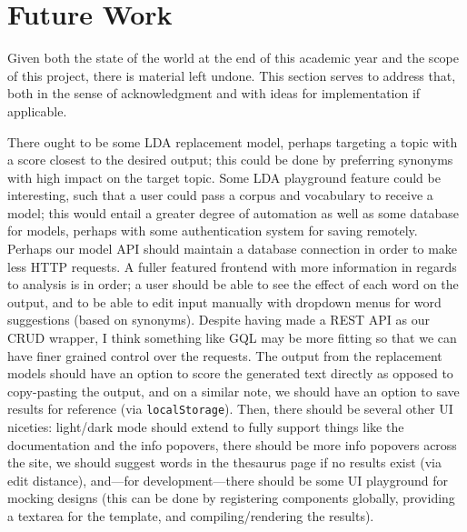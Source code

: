 \documentclass[11pt, twoside, reqno]{book}
\begin{document}
\section{Future Work}

Given both the state of the world at the end of this academic year and the scope of this project, there is material left undone. This section serves to address that, both in the sense of acknowledgment and with ideas for implementation if applicable.

There ought to be some LDA replacement model, perhaps targeting a topic with a score closest to the desired output; this could be done by preferring synonyms with high impact on the target topic. Some LDA playground feature could be interesting, such that a user could pass a corpus and vocabulary to receive a model; this would entail a greater degree of automation as well as some database for models, perhaps with some authentication system for saving remotely. Perhaps our model API should maintain a database connection in order to make less HTTP requests. A fuller featured frontend with more information in regards to analysis is in order; a user should be able to see the effect of each word on the output, and to be able to edit input manually with dropdown menus for word suggestions (based on synonyms). Despite having made a REST API as our CRUD wrapper, I think something like GQL may be more fitting so that we can have finer grained control over the requests. The output from the replacement models should have an option to score the generated text directly as opposed to copy-pasting the output, and on a similar note, we should have an option to save results for reference (via \texttt{localStorage}). Then, there should be several other UI niceties: light/dark mode should extend to fully support things like the documentation and the info popovers, there should be more info popovers across the site, we should suggest words in the thesaurus page if no results exist (via edit distance), and—for development—there should be some UI playground for mocking designs (this can be done by registering components globally, providing a textarea for the template, and compiling/rendering the results).
\end{document}
